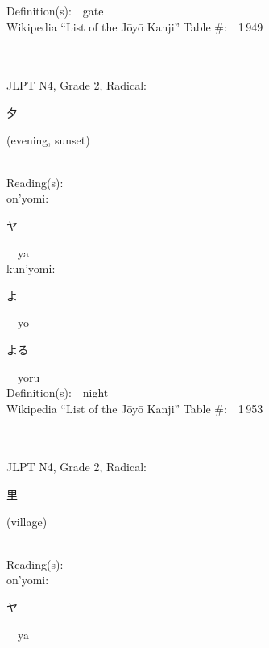 \begin{multicols}{2}
Definition(s):\ \ gate \\
Wikipedia ``List of the J\=oy\=o Kanji'' Table \#:\ \ 1\,949 \\
\ \ \\
{\fontsize{34pt}{40pt}  }\ \ \\  %
{JLPT N4, Grade 2, Radical:\ \ {\begin{CJK}{UTF8}{min} 夕 \end{CJK}} (evening, sunset) } \\
Reading(s):\ \ \\
{\hspace*{1em}}on'yomi:\ \ \\
{\hspace*{2em}}{\begin{CJK}{UTF8}{min} ヤ \end{CJK}}\ \ ya\ \ \\
{\hspace*{1em}}kun'yomi:\ \ \\
{\hspace*{2em}}{\begin{CJK}{UTF8}{min} よ \end{CJK}}\ \ yo\ \ \\
{\hspace*{2em}}{\begin{CJK}{UTF8}{min} よる \end{CJK}}\ \ yoru\ \ \\
Definition(s):\ \ night \\
Wikipedia ``List of the J\=oy\=o Kanji'' Table \#:\ \ 1\,953 \\
\ \ \\
{\fontsize{34pt}{40pt}  }\ \ \\  %
{JLPT N4, Grade 2, Radical:\ \ {\begin{CJK}{UTF8}{min} 里 \end{CJK}} (village) } \\
Reading(s):\ \ \\
{\hspace*{1em}}on'yomi:\ \ \\
{\hspace*{2em}}{\begin{CJK}{UTF8}{min} ヤ \end{CJK}}\ \ ya\ \ \\

\end{multicols}
